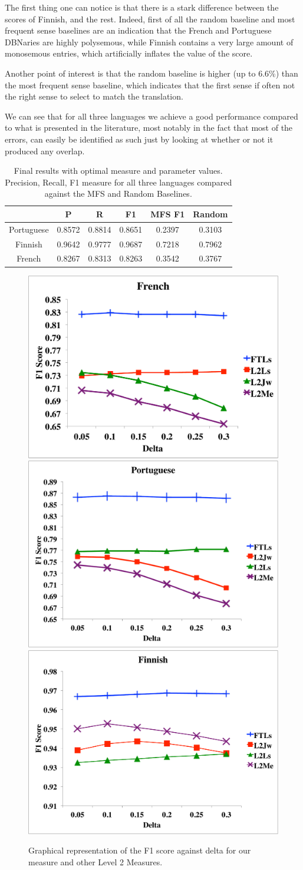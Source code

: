 \documentclass[10pt,a4paper,twoside]{article}
\begin{document}
The first thing one can notice is that there is a stark difference between the scores of Finnish, and the rest. Indeed, first of all the random baseline and most frequent sense baselines are an indication that the French and Portuguese DBNaries are highly polysemous, while Finnish contains a very large amount of monosemous entries, which artificially inflates the value of the score. 

Another point of interest is that the random baseline is higher (up to 6.6\%) than the most frequent sense baseline, which indicates that the first sense if often not the right sense to select to match the translation. 

We can see that for all three languages we achieve a good performance compared to what is presented in the literature, most notably in the fact that most of the errors, can easily be identified as such just by looking at whether or not it produced any overlap.

\begin{table}
{\centering \footnotesize
\begin{tabular}{|c|c|c|c|c|c|}
\hline &P&R&F1&MFS F1&Random\\
\hline Portuguese&0.8572&0.8814&0.8651&0.2397&0.3103\\
\hline Finnish&0.9642&0.9777&0.9687&0.7218&0.7962\\
\hline French&0.8267&0.8313&0.8263&0.3542&0.3767\\
\hline 
\end{tabular}
\caption{Final results with optimal measure and parameter values. Precision, Recall, F1 measure for all three languages compared against the MFS and Random Baselines.}
\label{tab:final}
}
\end{table} 

\begin{figure}
\centering
\includegraphics[width=.35\columnwidth]{french}
\includegraphics[width=.35\columnwidth]{portuguese}
\includegraphics[width=.35\columnwidth]{finnish}
\caption{Graphical representation of the F1 score against delta for our measure and other Level 2 Measures.}
\label{fig.2}
\end{figure}
\end{document}
